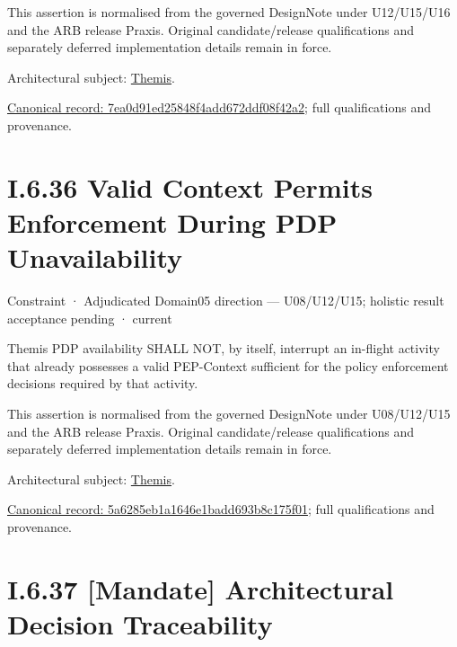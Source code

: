 This assertion is normalised from the governed DesignNote under U12/U15/U16 and the ARB release Praxis. Original candidate/release qualifications and separately deferred implementation details remain in force.



Architectural subject: \hyperref[element:899d34ec491948b68aad09e507dea6d1]{Themis}.


{\footnotesize \href{../../../../../../../../continuum/motivation/constraint/7ea0d91ed25848f4add672ddf08f42a2.md}{Canonical record: 7ea0d91ed25848f4add672ddf08f42a2}; full qualifications and provenance.}\par
\section*{I.6.36 Valid Context Permits Enforcement During PDP Unavailability}
\label{navigation:I.6.36}

\label{element:5a6285eb1a1646e1badd693b8c175f01}
{\small Constraint · Adjudicated Domain05 direction — U08/U12/U15; holistic result acceptance pending · current}\par

Themis PDP availability SHALL NOT, by itself, interrupt an in-flight activity that already possesses a valid PEP-Context sufficient for the policy enforcement decisions required by that activity.



This assertion is normalised from the governed DesignNote under U08/U12/U15 and the ARB release Praxis. Original candidate/release qualifications and separately deferred implementation details remain in force.



Architectural subject: \hyperref[element:899d34ec491948b68aad09e507dea6d1]{Themis}.


{\footnotesize \href{../../../../../../../../continuum/motivation/constraint/5a6285eb1a1646e1badd693b8c175f01.md}{Canonical record: 5a6285eb1a1646e1badd693b8c175f01}; full qualifications and provenance.}\par
\section*{I.6.37 [Mandate] Architectural Decision Traceability}
\label{navigation:I.6.37}


